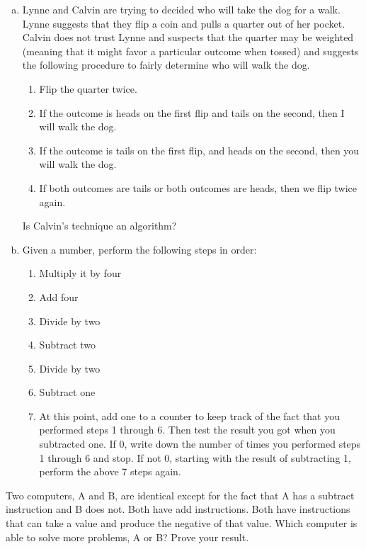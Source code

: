 \documentclass{patt}
\begin{document}
\begin{exercises}
\begin{enumerate}[b.]
\item[d.]
Lynne and Calvin are trying to decided who will take the dog
for a walk.  Lynne suggests that they flip a coin and pulls
a quarter out of her pocket.  Calvin does not trust Lynne
and suspects that the quarter may be weighted (meaning that
it might favor a particular outcome when tossed) and suggests
the following procedure to fairly determine who will walk the
dog.

\begin{enumerate}
\item[\rm1.] Flip the quarter twice.

\item[\rm2.] If the outcome is heads on the first flip and tails on the
second, then I will walk the dog.

\item[\rm3.] If the outcome is tails on the first flip, and heads on the
second, then you will walk the dog.

\item[\rm4.] If both outcomes are tails or both outcomes are heads,
then we flip twice again.
\end{enumerate}

Is Calvin's technique an algorithm?


\item [e.]
Given a number, perform the following steps in order:
\begin{enumerate}
\item[\rm1.] Multiply it by four
\item[\rm2.] Add four
\item[\rm3.] Divide by two
\item[\rm4.] Subtract two
\item[\rm5.] Divide by two
\item[\rm6.] Subtract one
\item[\rm7.] At this point, add one to a counter to keep track of the fact
that you performed steps 1 through 6. Then test the result you got
when you subtracted one. If 0, write down the number of times you performed
steps 1 through 6 and stop. If not 0, starting with the result of subtracting
1, perform the above 7 steps again.
\end{enumerate}
\end{enumerate}

\smallskip

\item[1.13]
[4] Two computers, A and B, are identical except for the fact that A
has a subtract instruction and B does not. Both have add instructions.
Both have instructions that can take a value and produce the negative
of that value. Which computer is able to solve more problems, A or B?
Prove your result.


\end{exercises}
\end{document}

